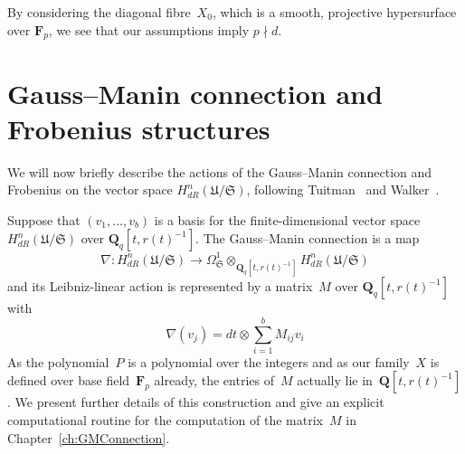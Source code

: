 \begin{rem}
By considering the diagonal fibre~$X_0$, which is a smooth, 
projective hypersurface over $\mathbf{F}_p$, we see that our 
assumptions imply $p \nmid d$.
\end{rem}


\section{Gauss--Manin connection and Frobenius structures}

We will now briefly describe the actions of the Gauss--Manin connection 
and Frobenius on the vector space $H_{dR}^{n}(\mathfrak{U}/\mathfrak{S})$, 
following Tuitman~\citep[\S 3.4.2, \S 3.6.1]{Tuitman2011} and 
Walker~\citep[\S 3.2.2.2]{Walker2009}.

Suppose that $(v_1,\dotsc,v_b)$ is a basis for the finite-dimensional 
vector space $H_{dR}^{n}(\mathfrak{U}/\mathfrak{S})$ over 
$\mathbf{Q}_q[t,r(t)^{-1}]$.  The Gauss--Manin connection is a map 
\begin{equation*}
\nabla \colon H_{dR}^{n}(\mathfrak{U}/\mathfrak{S}) 
    \to \Omega_{\mathfrak{S}}^{1}
    \otimes_{\mathbf{Q}_q[t,r(t)^{-1}]} H_{dR}^{n}(\mathfrak{U}/\mathfrak{S})
\end{equation*}
and its Leibniz-linear action is represented by a matrix~$M$ over 
$\mathbf{Q}_q[t,r(t)^{-1}]$ with 
\begin{equation*}
\nabla(v_j) = dt \otimes \sum_{i=1}^{b} M_{ij} v_i
\end{equation*}
As the polynomial~$P$ is a polynomial over the integers and 
as our family~$X$ is defined over base field~$\mathbf{F}_p$ 
already, the entries of~$M$ actually lie in~$\mathbf{Q}[t,r(t)^{-1}]$. 
We present further details of this construction and give an explicit 
computational routine for the computation of the matrix~$M$ in 
Chapter~\ref{ch:GMConnection}.

